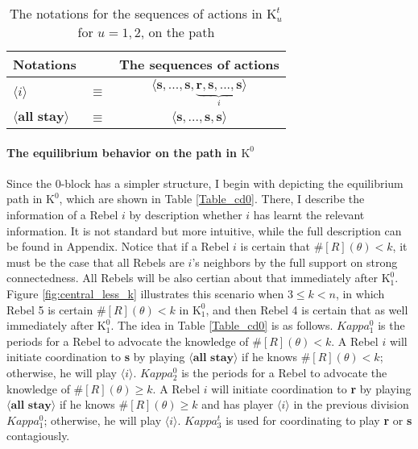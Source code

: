 \documentclass[12pt,letter]{article}
\newcommand{\Kappa}{\mathrm{K}}
\theoremstyle{definition}
\theoremstyle{remark}
\theoremstyle{claim}
\begin{document}
\begin{table}[!htbp]
\caption{The notations for the sequences of actions in $\Kappa^t_{u}$ for $u=1,2$, on the path}
\label{Table_msg_coordination}
\begin{center}
\begin{tabular}{l c c}
Notations & &The sequences of actions \\
\hline
\hline
$\langle i \rangle$ 				& $\equiv$ 			& $\langle \textbf{s},...,\textbf{s},\underbrace{\textbf{r},\textbf{s},...,\textbf{s}}_{i} \rangle$  \\
$\langle \textbf{all stay} \rangle$	 					& $\equiv$ 			& $\langle \textbf{s},...,\textbf{s},{\textbf{s}}\rangle$  \\
\hline
\end{tabular}
\end{center}
\end{table}


\paragraph{The equilibrium behavior on the path in $\Kappa^0$}
Since the $0$-block has a simpler structure, I begin with depicting the equilibrium path in $\Kappa^0$, which are shown in Table \ref{Table_cd0}. There, I describe the information of a Rebel $i$ by description whether $i$ has learnt the relevant information. It is not standard but more intuitive, while the full description can be found in Appendix. Notice that if a Rebel $i$ is certain that $\#[R](\theta)<k$, it must be the case that all Rebels are $i$'s neighbors by the full support on strong connectedness. All Rebels will be also certian about that immediately after $\Kappa^0_{1}$. Figure \ref{fig:central_less_k} illustrates this scenario when $3\leq k <n$, in which Rebel 5 is certain $\#[R](\theta)<k$ in $\Kappa^0_1$, and then Rebel 4 is certain that as well immediately after $\Kappa^0_1$. The idea in Table \ref{Table_cd0} is as follows. $Kappa^0_1$ is the periods for a Rebel to advocate the knowledge of $\# [R](\theta)<k$. A Rebel $i$ will initiate coordination to \textbf{s} by playing $\langle \textbf{all stay} \rangle$ if he knows $\# [R](\theta)<k$; otherwise, he will play $\langle i \rangle$. $Kappa^0_2$ is the periods for a Rebel to advocate the knowledge of $\# [R](\theta)\geq k$. A Rebel $i$ will initiate coordination to \textbf{r} by playing $\langle \textbf{all stay} \rangle$ if he knows $\# [R](\theta)\geq k$ and has player $\langle i \rangle$ in the previous division $Kappa^0_1$; otherwise, he will play $\langle i \rangle$. $Kappa^t_3$ is used for coordinating to play \textbf{r} or \textbf{s} contagiously.
\end{document}
